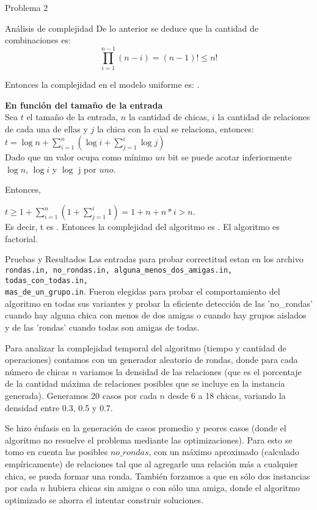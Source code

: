 \begin{section}{Problema 2}
\begin{subsection}{Análisis de complejidad}
			De lo anterior se deduce que la cantidad de combinaciones es: $$\displaystyle\prod_{i=1}^{n-1} (n-i) = (n-1)! \leq n!$$

			Entonces la complejidad en el modelo uniforme es:  .\VSP
		
			\noindent\textbf{En función del tamaño de la entrada}\\

				Sea $t$ el tamaño de la entrada, $n$ la cantidad de chicas, $i$ la cantidad de relaciones de cada una de ellas y $j$ la chica con la cual se relaciona, entonces:\\
				
				$t=\log n + \sum_{i=1}^n (\log i + \sum_{j=1}^i \log j)$\\
				
				Dado que un valor ocupa como mínimo $un$ bit se puede acotar inferiormente $\log n$, $\log i$ y $\log$ j por $uno$.
				
				Entonces,
				
				$t \geq 1 + \sum_{i=1}^n (1 + \sum_{j=1}^i 1)=1 + n + n*i > n$.\\
				
				
				Es decir, t es . Entonces la complejidad del algoritmo es . El algoritmo es factorial.
	\end{subsection}

	\begin{subsection}{Pruebas y Resultados}
		Las entradas para probar correctitud estan en los archivo \texttt{rondas.in, no\_rondas.in, alguna\_menos\_dos\_amigas.in, todas\_con\_todas.in, \\
		mas\_de\_un\_grupo.in}.
		Fueron elegidas para probar el comportamiento del algoritmo en todas sus variantes y probar la eficiente detección de las 'no\_rondas' cuando hay alguna chica con menos de dos amigas o cuando hay grupos aislados y de las 'rondas' cuando todas son amigas de todas.
		
		Para analizar la complejidad temporal del algoritmo (tiempo y cantidad de operaciones) contamos con un generador aleatorio de rondas, donde para cada número de chicas $n$ variamos la densidad de las relaciones (que es el porcentaje de la cantidad máxima de relaciones posibles que se incluye en la instancia generada). Generamos 20 casos por cada $n$ desde 6 a 18 chicas, variando la densidad entre 0.3, 0.5 y 0.7.

		 Se hizo énfasis en la generación de casos promedio y peores casos (donde el algoritmo no resuelve el problema mediante las optimizaciones). Para esto se tomo en cuenta las posibles $no\_rondas$, con un máximo aproximado (calculado empíricamente) de relaciones tal que al agregarle una relación más a cualquier chica, se pueda formar una ronda. También forzamos a que en sólo dos instancias por cada $n$ hubiera chicas sin amigas o con sólo una amiga, donde el algoritmo optimizado se ahorra el intentar construir soluciones.
		

\end{subsection}
\end{section}
